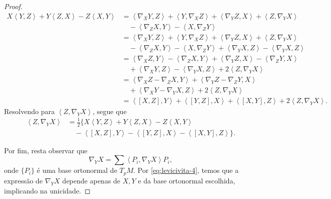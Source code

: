 \begin{theorem}
\begin{proof}
		\begin{align*}
			X\left<Y,Z\right> +Y\left<Z,X\right> -Z\left<X,Y\right> & = \left<\nabla_{X}Y,Z\right> +\left<Y,\nabla_{X}Z\right> + \left<\nabla_{Y}Z,X\right> + \left<Z,\nabla_{Y}X\right>       \\
			                                                        & \quad - \left<\nabla_{Z}X,Y\right> - \left<X,\nabla_{Z}Y\right>                                                          \\
			                                                        & = \left<\nabla_{X}Y,Z\right> +\left<Y,\nabla_{X}Z\right> + \left<\nabla_{Y}Z,X\right> + \left<Z,\nabla_{Y}X\right>       \\
			                                                        & \quad - \left<\nabla_{Z}X,Y\right> - \left<X,\nabla_{Z}Y\right>+ \left<\nabla_{Y}X,Z\right> - \left<\nabla_{Y}X,Z\right> \\
			                                                        & =\left<\nabla_{X}Z,Y\right>-\left<\nabla_{Z}X,Y\right> +\left<\nabla_{Y}Z,X\right> -\left<\nabla_{Z}Y,X\right>           \\
			                                                        & \quad + \left<\nabla_{X}Y,Z\right> - \left<\nabla_{Y}X,Z\right> +2\left<Z,\nabla_{Y}X\right>                             \\
			                                                        & = \left<\nabla_{X}Z-\nabla_{Z}X,Y\right> + \left<\nabla_{Y}Z-\nabla_{Z}Y,X\right>                                        \\
			                                                        & \quad + \left<\nabla_{X}Y-\nabla_{Y}X,Z\right>  +2 \left<Z,\nabla_{Y}X\right>                                            \\
			                                                        & = \left<[X,Z],Y\right> + \left<[Y,Z],X\right> +\left<[X,Y],Z\right> +2 \left<Z,\nabla_{Y}X\right>.
		\end{align*}
		Resolvendo para $\left<Z,\nabla_{Y}X\right>$, segue que
		\begin{align}
			\left<Z,\nabla_{Y}X\right> & =\frac{1}{2} \{X\left<Y,Z\right> +Y\left<Z,X\right> -Z\left<X,Y\right>                \nonumber        \\
			                           & \quad - \left<[X,Z],Y\right> - \left<[Y,Z],X\right> -\left<[X,Y],Z\right>  \}. \label{eq:levicivita-4}
		\end{align}

		Por fim, resta observar que
		\begin{equation*}
			\nabla_{Y}X = \sum \left<P_{i},\nabla_{Y}X\right> P_{i},
		\end{equation*}
		onde $\{ P_{i} \}$ é uma base ortonormal de $T_{p}M$. Por \eqref{eq:levicivita-4}, temos que a expressão de $\nabla_{Y}X$ depende apenas de $X, Y$ e da base ortonormal escolhida, implicando na unicidade.


\end{proof}
\end{theorem}
